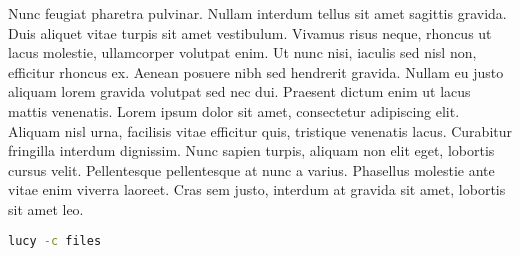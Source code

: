 Nunc feugiat pharetra pulvinar. Nullam interdum tellus sit amet sagittis gravida. Duis aliquet vitae turpis sit amet vestibulum. Vivamus risus neque, rhoncus ut lacus molestie, ullamcorper volutpat enim. Ut nunc nisi, iaculis sed nisl non, efficitur rhoncus ex. Aenean posuere nibh sed hendrerit gravida. Nullam eu justo aliquam lorem gravida volutpat sed nec dui. Praesent dictum enim ut lacus mattis venenatis. Lorem ipsum dolor sit amet, consectetur adipiscing elit. Aliquam nisl urna, facilisis vitae efficitur quis, tristique venenatis lacus. Curabitur fringilla interdum dignissim. Nunc sapien turpis, aliquam non elit eget, lobortis cursus velit. Pellentesque pellentesque at nunc a varius. Phasellus molestie ante vitae enim viverra laoreet. Cras sem justo, interdum at gravida sit amet, lobortis sit amet leo.
\begin{lstlisting}[language=Bash]
  lucy -c files
\end{lstlisting}
